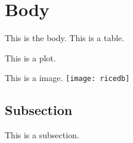 \section{Body}\label{body}
This is the body.
This is a table.

This is a plot.

This is a image.
\texttt{[image: ricedb]}
\subsection{Subsection}\label{subsection}
This is a subsection.

